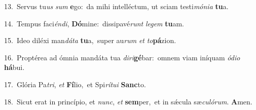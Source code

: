 {\numbfont\textcolor{\numbcolor}{13.}}~Servus tu\textit{us} \textit{sum} \textbf{e}\-go:~\star da mihi intelléctum, ut sciam testi\-\textit{mó}\-\textit{ni}\textit{a} \textbf{tu}\-a.\par
{\numbfont\textcolor{\numbcolor}{14.}}~Tempus faci\-\textit{én}\-\textit{di}, \textbf{Dó}\-mine:~\star dissipavé\textit{runt} \textit{le}\-\textit{gem} \textbf{tu}\-am.\par
{\numbfont\textcolor{\numbcolor}{15.}}~Ideo diléxi man\-\textit{dá}\-\textit{ta} \textbf{tu}\-a,~\star super au\textit{rum} \textit{et} \textit{to}\-\textbf{pá}zion.\par
{\numbfont\textcolor{\numbcolor}{16.}}~Proptérea ad ómnia mandáta tua \textit{di}\-\textit{ri}\textbf{gé}bar:~\star omnem viam iníquam \textit{ó}\-\textit{di}\textit{o} \textbf{há}\-bui.\par
{\numbfont\textcolor{\numbcolor}{17.}}~Glória Pa\-\textit{tri}\-, \textit{et} \textbf{Fí}\-lio,~\star et Spi\-\textit{rí}\-\textit{tu}\textit{i} \textbf{Sanc}\-to.\par
{\numbfont\textcolor{\numbcolor}{18.}}~Sicut erat in princípio, et \textit{nunc}\-, \textit{et} \textbf{sem}\-per,~\star et in sǽcula sæ\-\textit{cu}\-\textit{ló}\textit{rum}. \textbf{A}\-men.\par
